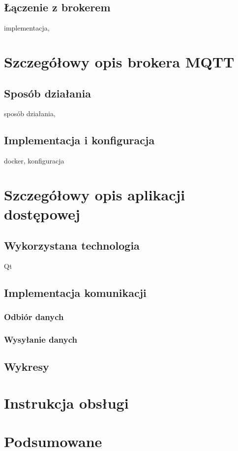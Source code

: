 \documentclass[eng, 11pt, twoside, openany]{mgr}
\begin{document}
    \section{Łączenie z brokerem}
      implementacja, 

  \chapter{Szczegółowy opis brokera MQTT}
    \section{Sposób działania}
      sposób działania,

    \section{Implementacja i konfiguracja}
      docker, konfiguracja

  \chapter{Szczegółowy opis aplikacji dostępowej}
    \section{Wykorzystana technologia}
        Qt

    \section{Implementacja komunikacji}
      \subsection{Odbiór danych}
      \subsection{Wysyłanie danych}
    \section{Wykresy}


  \chapter{Instrukcja obsługi}

  \chapter{Podsumowane}
\end{document}

